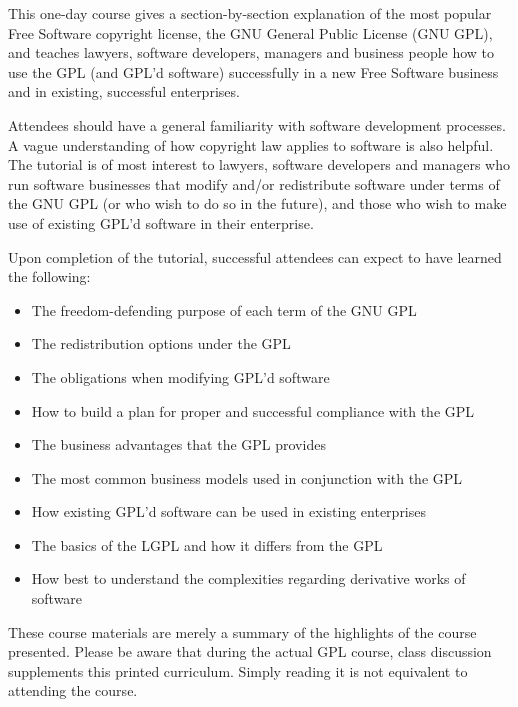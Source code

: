 \documentclass[11pt, letterpaper]{book}
\begin{document}
This one-day course gives a section-by-section explanation of the most
popular Free Software copyright license, the GNU General Public License
(GNU GPL), and teaches lawyers, software developers, managers and business
people how to use the GPL (and GPL'd software) successfully in a new Free
Software business and in existing, successful enterprises.

Attendees should have a general familiarity with software development
processes. A vague understanding of how copyright law applies to software
is also helpful. The tutorial is of most interest to lawyers, software
developers and managers who run software businesses that modify and/or
redistribute software under terms of the GNU GPL (or who wish to do so in
the future), and those who wish to make use of existing GPL'd software in
their enterprise.

Upon completion of the tutorial, successful attendees can expect to have
learned the following:

\begin{itemize}

  \item The freedom-defending purpose of each term of the GNU GPL

  \item The redistribution options under the GPL

  \item The obligations when modifying GPL'd software

  \item How to build a plan for proper and successful compliance with the GPL

  \item The business advantages that the GPL provides

  \item The most common business models used in conjunction with the GPL

  \item How existing GPL'd software can be used in existing enterprises

  \item The basics of the LGPL and how it differs from the GPL

  \item How best to understand the complexities regarding derivative
        works of software
\end{itemize}

\bigskip

These course materials are merely a summary of the highlights of the
course presented. Please be aware that during the actual GPL course, class
discussion supplements this printed curriculum. Simply reading it is
not equivalent to attending the course.
\end{document}

